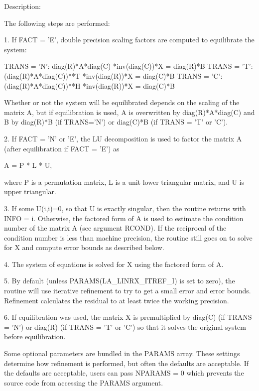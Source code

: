 \begin{DoxyParagraph}{Description\+: }
\begin{DoxyVerb}    The following steps are performed:

    1. If FACT = 'E', double precision scaling factors are computed to equilibrate
    the system:

      TRANS = 'N':  diag(R)*A*diag(C)     *inv(diag(C))*X = diag(R)*B
      TRANS = 'T': (diag(R)*A*diag(C))**T *inv(diag(R))*X = diag(C)*B
      TRANS = 'C': (diag(R)*A*diag(C))**H *inv(diag(R))*X = diag(C)*B

    Whether or not the system will be equilibrated depends on the
    scaling of the matrix A, but if equilibration is used, A is
    overwritten by diag(R)*A*diag(C) and B by diag(R)*B (if TRANS='N')
    or diag(C)*B (if TRANS = 'T' or 'C').

    2. If FACT = 'N' or 'E', the LU decomposition is used to factor
    the matrix A (after equilibration if FACT = 'E') as

      A = P * L * U,

    where P is a permutation matrix, L is a unit lower triangular
    matrix, and U is upper triangular.

    3. If some U(i,i)=0, so that U is exactly singular, then the
    routine returns with INFO = i. Otherwise, the factored form of A
    is used to estimate the condition number of the matrix A (see
    argument RCOND). If the reciprocal of the condition number is less
    than machine precision, the routine still goes on to solve for X
    and compute error bounds as described below.

    4. The system of equations is solved for X using the factored form
    of A.

    5. By default (unless PARAMS(LA_LINRX_ITREF_I) is set to zero),
    the routine will use iterative refinement to try to get a small
    error and error bounds.  Refinement calculates the residual to at
    least twice the working precision.

    6. If equilibration was used, the matrix X is premultiplied by
    diag(C) (if TRANS = 'N') or diag(R) (if TRANS = 'T' or 'C') so
    that it solves the original system before equilibration.\end{DoxyVerb}
 \begin{DoxyVerb}     Some optional parameters are bundled in the PARAMS array.  These
     settings determine how refinement is performed, but often the
     defaults are acceptable.  If the defaults are acceptable, users
     can pass NPARAMS = 0 which prevents the source code from accessing
     the PARAMS argument.\end{DoxyVerb}

\end{DoxyParagraph}

